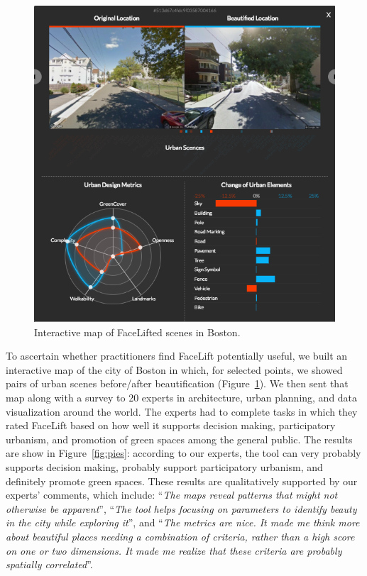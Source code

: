 \begin{figure}[t!]
	\centering
	\includegraphics[width=\columnwidth]{Plot/UI.png}
	\caption{Interactive map of FaceLifted scenes in Boston.}
	\label{facelift-UI}
\end{figure}



To ascertain whether practitioners find FaceLift potentially useful, we built an interactive map of the city of Boston in which, for  selected points, we showed pairs of urban scenes before/after beautification (Figure~\ref{facelift-UI}). We then sent that map along with a survey to 20 experts in architecture, urban planning, and data visualization around the world.  The experts had to complete tasks in which they rated FaceLift based on how well it supports decision making, participatory urbanism, and promotion of green spaces among the general public. The results are show in Figure~\ref{fig:pies}: according to our experts, the tool can very probably supports decision making, probably support participatory urbanism, and definitely promote green spaces.  These results are  qualitatively supported by our experts' comments, which include: ``\textit{The maps reveal patterns that might not otherwise be apparent}'',  ``\textit{The tool helps focusing on parameters to identify beauty in the city while exploring it}'',  and ``\textit{The metrics are nice. It made me think more about beautiful places needing a combination of criteria, rather than a high score on one or two dimensions. It made me realize that these criteria are probably spatially correlated}''.






